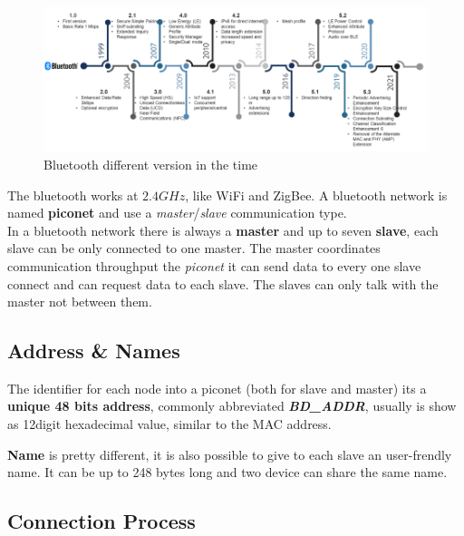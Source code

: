 \begin{figure}[h]
    \centering
    \includegraphics[width=\textwidth]{img/bluetooth_timeline}
    \caption{Bluetooth different version in the time}
\end{figure}

The bluetooth works at $2.4GHz$, like WiFi and ZigBee. A bluetooth network is named \textbf{piconet} and use a \textit{master}/\textit{slave} communication type. \\
In a bluetooth network there is always a \textbf{master} and up to seven \textbf{slave}, each slave can be only connected to one master. The master coordinates communication throughput the \textit{piconet} it can send data to every one slave connect and can request data to each slave. The slaves can only talk with the master not between them. 

\subsection{Address \& Names}
The identifier for each node into a piconet (both for slave and master) its a \textbf{unique 48 bits address}, commonly abbreviated \textbf{\textit{BD\_ADDR}}, usually is show as 12digit hexadecimal value, similar to the MAC address.
\begin{boxA}
    \textbf{Name} is pretty different, it is also possible to give to each slave an user-frendly name. It can be up to 248 bytes long and two device can share the same name.
\end{boxA}

\subsection{Connection Process}

